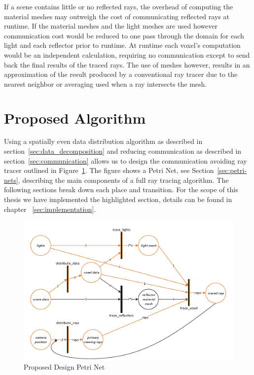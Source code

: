 If a scene contains little or no reflected rays, the overhead of computing the
material meshes may outweigh the cost of communicating reflected rays at 
runtime.  If the material meshes and the light meshes are used however 
communication cost would be reduced to one pass through the domain for each 
light and each reflector prior to runtime.  At runtime each voxel's computation
would be an independent calculation, requiring no communication except to send
back the final results of the traced rays.  The use of meshes however, results 
in an approximation of the result produced by a conventional ray tracer due to 
the nearest neighbor or averaging used when a ray intersects the mesh.

\section{Proposed Algorithm}
\label{sec:proposed-algorithm}
Using a spatially even data distribution algorithm as described in 
section~\ref{sec:data_decomposition} and reducing communication as described in 
section~\ref{sec:communication} allows us to design the communication 
avoiding ray tracer outlined in Figure~\ref{fig:design}.  The figure shows a 
Petri Net, see Section~\ref{sec:petri-nets}, describing the main components of 
a full ray tracing algorithm.  The following sections break down each place and
transition.  For the scope of this thesis we have implemented the highlighted 
section, details can be found in chapter ~\ref{sec:implementation}.

\begin{figure}[!htb]
\centering
  \includegraphics[width=\linewidth]{drawings/Design.pdf}
\caption{Proposed Design Petri Net}
\label{fig:design}
\end{figure}


